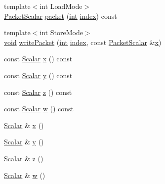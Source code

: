 \begin{DoxyCompactItemize}
\item 
{\footnotesize template$<$int Load\-Mode$>$ }\\\hyperlink{class_matrix_base_a58f32cd6a06433ee7a60efa03e99183a}{Packet\-Scalar} \hyperlink{class_matrix_base_addf567e4fbbca76bbc590832bf62b884}{packet} (\hyperlink{ioapi_8h_a787fa3cf048117ba7123753c1e74fcd6}{int} \hyperlink{glext_8h_ab47dd9958bcadea08866b42bf358e95e}{index}) const 
\item 
{\footnotesize template$<$int Store\-Mode$>$ }\\\hyperlink{group___u_a_v_objects_plugin_ga444cf2ff3f0ecbe028adce838d373f5c}{void} \hyperlink{class_matrix_base_a4edd0c63f885b2dc7571d3d28d19be88}{write\-Packet} (\hyperlink{ioapi_8h_a787fa3cf048117ba7123753c1e74fcd6}{int} \hyperlink{glext_8h_ab47dd9958bcadea08866b42bf358e95e}{index}, const \hyperlink{class_matrix_base_a58f32cd6a06433ee7a60efa03e99183a}{Packet\-Scalar} \&\hyperlink{glext_8h_a1db9d104e3c2128177f26aff7b46982f}{x})
\item 
const \hyperlink{class_matrix_base_a625df8339dc2d816cbc0fd66e7dadaf5}{Scalar} \hyperlink{class_matrix_base_a94bfff87d68a2877464cf612ede5e452}{x} () const 
\item 
const \hyperlink{class_matrix_base_a625df8339dc2d816cbc0fd66e7dadaf5}{Scalar} \hyperlink{class_matrix_base_aebcd432696cd8cf8b143297e78463afc}{y} () const 
\item 
const \hyperlink{class_matrix_base_a625df8339dc2d816cbc0fd66e7dadaf5}{Scalar} \hyperlink{class_matrix_base_a330cbf201e126b06913d4a4c2c372272}{z} () const 
\item 
const \hyperlink{class_matrix_base_a625df8339dc2d816cbc0fd66e7dadaf5}{Scalar} \hyperlink{class_matrix_base_a037309cc62df6ee0166e59f71c88ab53}{w} () const 
\item 
\hyperlink{class_matrix_base_a625df8339dc2d816cbc0fd66e7dadaf5}{Scalar} \& \hyperlink{class_matrix_base_a2ae714d2f4d7e806d2334f8f521af05d}{x} ()
\item 
\hyperlink{class_matrix_base_a625df8339dc2d816cbc0fd66e7dadaf5}{Scalar} \& \hyperlink{class_matrix_base_a41157d9ea4f84b373064df422a971b1f}{y} ()
\item 
\hyperlink{class_matrix_base_a625df8339dc2d816cbc0fd66e7dadaf5}{Scalar} \& \hyperlink{class_matrix_base_a7cbf8f831d0191f9fb8d727e2284923c}{z} ()
\item 
\hyperlink{class_matrix_base_a625df8339dc2d816cbc0fd66e7dadaf5}{Scalar} \& \hyperlink{class_matrix_base_a1b76ba47f73962b796bf807dc3923d65}{w} ()
\item 

\end{DoxyCompactItemize}
